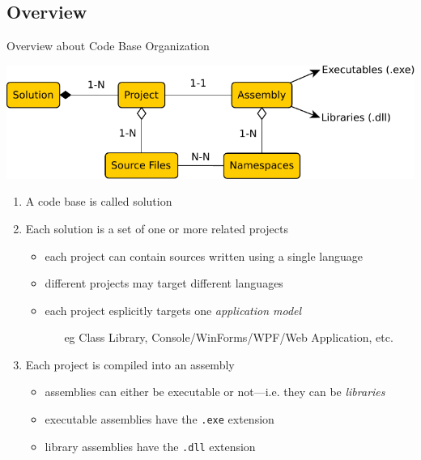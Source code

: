 \documentclass[presentation]{beamer}
\begin{document}
\subsection{Overview}

\begin{frame}[allowframebreaks]{Overview about Code Base Organization}
    \begin{center}
        \includegraphics[width=\linewidth]{img/code-base.pdf}
    \end{center}

    \medskip

    \begin{enumerate}
        \item A \dotnet code base is called \alert{solution}
        
        \bigskip

        \item Each solution is a set of one or more related \alert{projects}
        \begin{itemize}
            \item each project can contain sources written using a single \dotnet language
            \item different projects may target different \dotnet languages
            \item each project esplicitly targets one \emph{application model}
            \begin{itemize}
                \item[eg] Class Library, Console/WinForms/WPF/Web Application, etc.
            \end{itemize}
        \end{itemize}

        \framebreak

        \item Each project is compiled into an \alert{assembly}
        \begin{itemize}
            \item assemblies can either be executable or not---i.e. they can be \emph{libraries}
            \item executable assemblies have the \texttt{.exe} extension 
            \item library assemblies have the \texttt{.dll} extension
        \end{itemize}


\end{enumerate}
\end{frame}
\end{document}
